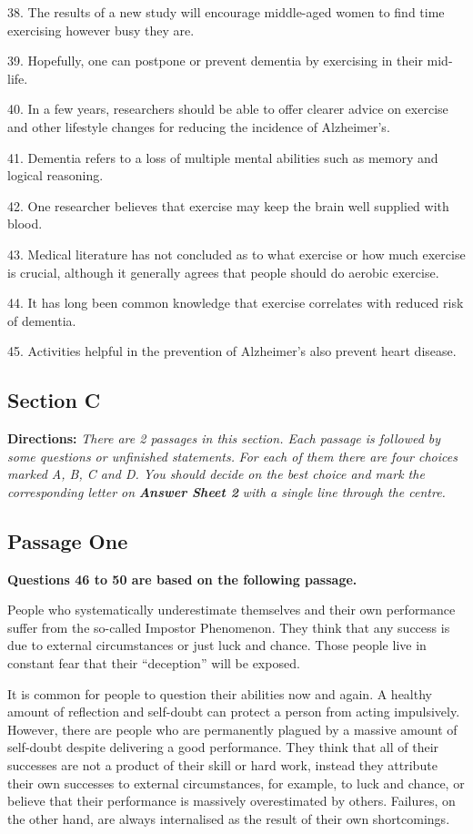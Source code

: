 \documentclass[UTF8,11pt]{ctexart}
\begin{document}
38. The results of a new study will encourage middle-aged women to find time exercising however busy they are.


39. Hopefully, one can postpone or prevent dementia by exercising in their mid-life.


40. In a few years, researchers should be able to offer clearer advice on exercise and other lifestyle changes for reducing the incidence of Alzheimer’s.


41. Dementia refers to a loss of multiple mental abilities such as memory and logical reasoning.


42. One researcher believes that exercise may keep the brain well supplied with blood.


43. Medical literature has not concluded as to what exercise or how much exercise is crucial, although it generally agrees that people should do aerobic exercise.


44. It has long been common knowledge that exercise correlates with reduced risk of dementia.


45. Activities helpful in the prevention of Alzheimer’s also prevent heart disease.


\subsection*{\textbf{Section C}}


\textbf{Directions: }\textit{There are 2 passages in this section. Each passage is followed by some questions or unfinished statements.} \textit{For each of them there are four choices marked A, B, C and D. You should decide on the best choice and mark the} \textit{corresponding letter on }\textbf{\textit{Answer Sheet 2}}\textit{ with a single line through the centre.}


\subsection*{\textbf{Passage One}}


\textbf{Questions 46 to 50 are based on the following passage.}


People who systematically underestimate themselves and their own performance suffer from the so-called Impostor Phenomenon. They think that any success is due to external circumstances or just luck and chance. Those people live in constant fear that their “deception” will be exposed.


It is common for people to question their abilities now and again. A healthy amount of reflection and self-doubt can protect a person from acting impulsively. However, there are people who are permanently plagued by a massive amount of self-doubt despite delivering a good performance. They think that all of their successes are not a product of their skill or hard work, instead they attribute their own successes to external circumstances, for example, to luck and chance, or believe that their performance is massively overestimated by others. Failures, on the other hand, are always internalised as the result of their own shortcomings.
\end{document}
